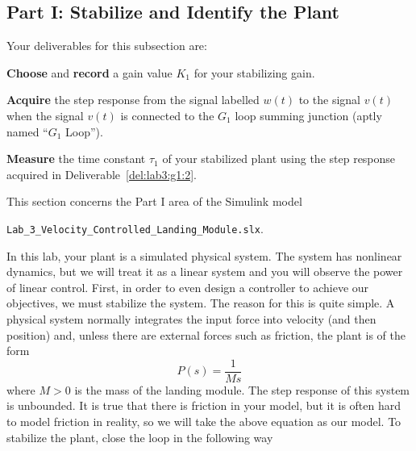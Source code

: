 \subsection{Part I: Stabilize and Identify the Plant}\label{Lab:3:Part:I}
Your deliverables for this subsection are:
%
\begin{deliverable}[label={del:lab3:g1:1}]
  \textbf{Choose} and \textbf{record} a gain value \(K_1\) for your stabilizing gain.
\end{deliverable}
%
\begin{deliverable}[label={del:lab3:g1:2}]
   \textbf{Acquire} the step response from the signal labelled \(w(t)\) to the signal \(v(t)\) when the signal \(v(t)\) is connected to the \(G_1\) loop summing junction (aptly named ``\(G_1\) Loop'').
\end{deliverable}
%
\begin{deliverable}[label={del:lab3:g1:3}]
  \textbf{Measure} the time constant \(\tau_1\) of your stabilized plant using the step response acquired in Deliverable~\ref{del:lab3:g1:2}.
\end{deliverable}
%
This section concerns the Part I area of the Simulink model
\begin{center}
  \texttt{Lab\_3\_Velocity\_Controlled\_Landing\_Module.slx}.
\end{center}
In this lab, your plant is a simulated physical system.
The system has nonlinear dynamics, but we will treat it as a linear system and you will observe the power of linear control.
First, in order to even design a controller to achieve our objectives, we must stabilize the system.
The reason for this is quite simple. A physical system normally integrates the input force into velocity (and then position) and, unless there are external forces such as friction, the plant is of the form
\[
  P(s)
    =
      \frac{1}{M s}
\]
where \(M > 0\) is the mass of the landing module.
The step response of this system is unbounded.
It is true that there is friction in your model, but it is often hard to model friction in reality, so we will take the above equation as our model.
To stabilize the plant, close the loop in the following way
%
